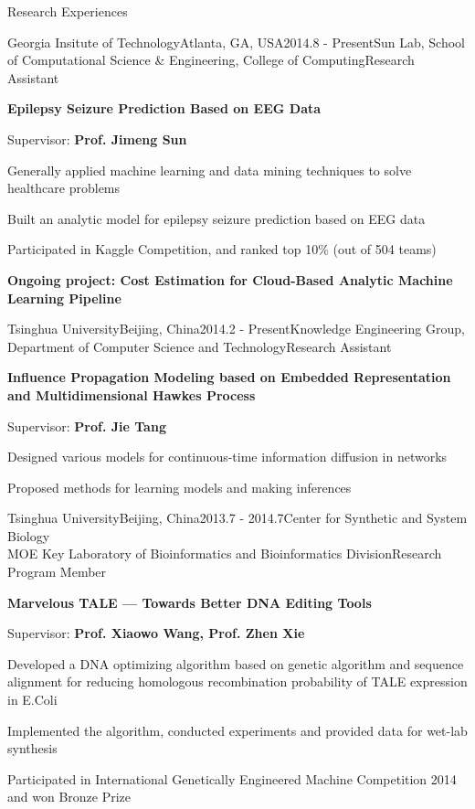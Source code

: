 \documentclass{resume} %
\begin{document}
\begin{rSection}{Research Experiences}

\begin{rSubsection}{Georgia Insitute of Technology}{Atlanta, GA, USA}{2014.8 - Present}{Sun Lab, School of Computational Science \& Engineering,  College of Computing}{Research Assistant}
\item  {\bf Epilepsy Seizure Prediction Based on EEG Data}
\item Supervisor: {\bf Prof. Jimeng Sun}
\item Generally applied machine learning and data mining techniques to solve healthcare problems
\item Built an analytic model for epilepsy seizure prediction based on EEG data
\item Participated in Kaggle Competition, and ranked top 10\% (out of 504 teams)   
\item {\bf Ongoing project: Cost Estimation for Cloud-Based Analytic Machine Learning Pipeline }
\end{rSubsection}



\begin{rSubsection}{Tsinghua University}{Beijing, China}{2014.2 - Present}{Knowledge Engineering Group, Department of Computer Science and Technology}{Research Assistant}
\item {\bf Influence Propagation Modeling based on Embedded Representation and Multidimensional Hawkes Process}
\item Supervisor: {\bf Prof. Jie Tang}
\item Designed various models for continuous-time information diffusion in networks 
\item Proposed methods for learning models and making inferences
\end{rSubsection}



\begin{rSubsection}{Tsinghua University}{Beijing, China}{2013.7 - 2014.7}{Center for Synthetic and System Biology\\ MOE Key Laboratory of Bioinformatics and Bioinformatics Division}{Research Program Member}
    \item {\bf Marvelous TALE --- Towards Better DNA Editing Tools}
	\item Supervisor: {\bf Prof. Xiaowo Wang, Prof. Zhen Xie}
	\item Developed a DNA optimizing algorithm based on genetic algorithm and sequence alignment for reducing homologous recombination probability of TALE expression in E.Coli
	\item Implemented the algorithm, conducted experiments and provided data for wet-lab synthesis
	\item Participated in International Genetically Engineered Machine Competition 2014 and won Bronze Prize
\end{rSubsection}


\end{rSection}
\end{document}
